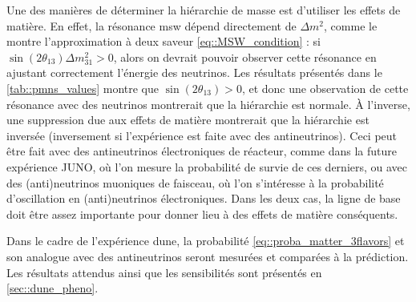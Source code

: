 	            Une des manières de déterminer la hiérarchie de masse est d'utiliser les effets de matière. En effet, la résonance \gls{msw} dépend directement de $\Delta m^2$, comme le montre l'approximation à deux saveur \eqref{eq::MSW_condition} : si $\sin(2\theta_{13})\Delta m^2_{31} > 0$, alors on devrait pouvoir observer cette résonance en ajustant correctement l'énergie des neutrinos. Les résultats présentés dans le \autoref{tab::pmns_values} montre que $\sin(2\theta_{13}) > 0$, et donc une observation de cette résonance avec des neutrinos montrerait que la hiérarchie est normale. À l'inverse, une suppression due aux effets de matière montrerait que la hiérarchie est inversée (inversement si l'expérience est faite avec des antineutrinos). Ceci peut être fait avec des antineutrinos électroniques de réacteur, comme dans la future expérience JUNO\cite{Yang2015}, où l'on mesure la probabilité de survie de ces derniers, ou avec des (anti)neutrinos muoniques de faisceau, où l'on s'intéresse à la probabilité d'oscillation en (anti)neutrinos électroniques. Dans les deux cas, la ligne de base doit être assez importante pour donner lieu à des effets de matière conséquents.
	            
	            Dans le cadre de l'expérience \gls{dune}, la probabilité \eqref{eq::proba_matter_3flavors} et son analogue avec des antineutrinos seront mesurées et comparées à la prédiction. Les résultats attendus ainsi que les sensibilités sont présentés en \autoref{sec::dune_pheno}. 
	            
